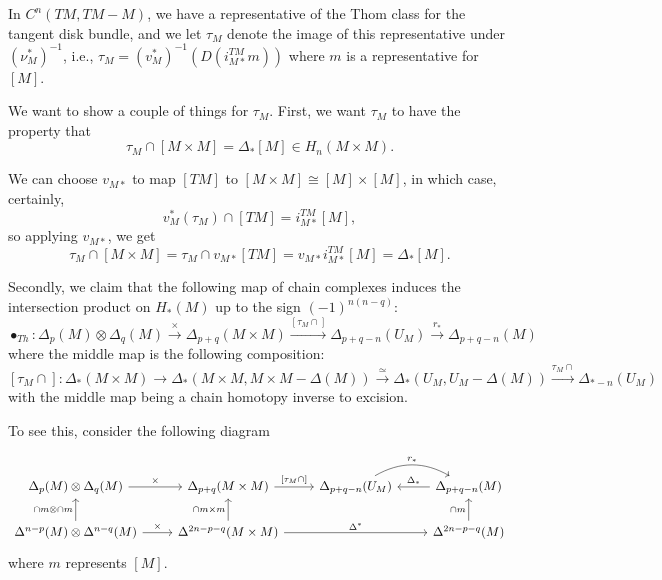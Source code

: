 \documentclass[reqno]{amsart}
\theoremstyle{definition}
\theoremstyle{remark}
\begin{document}
    In $C^{n}\left( TM, TM - M \right) $, we have
    a representative of the Thom class for
    the tangent disk bundle, and we let
    $\tau_M$ denote the image of this representative
    under $(\nu_M^{*})^{-1}$, i.e.,
    $\tau_M = (v_M^{*})^{-1} \left( D\left( i_{M*}^{TM} m
    \right)  \right) $
    where $m$ is a representative for
    $\left[ M \right] $.

    We want to show a couple of things for
    $\tau_M$. 
    First\todo{}, we want
    $\tau_M$ to have the property that
    \[
    \tau_M \cap \left[ M \times M \right] = 
    \Delta_* \left[ M \right]  \in H_n\left( M \times M \right) .
    \] 

    We can choose $v_{M*}$ to map
    $\left[ TM \right] $ to $\left[ M \times M \right] \cong
    \left[ M \right] \times \left[ M \right] $, in which case,
    certainly,
    \[
    v_M^{*}(\tau_M) \cap \left[ TM \right] =
    i_{M*}^{TM} \left[ M \right],
    \] 
    so applying $v_{M*}$, we get
    \[
    \tau_M \cap \left[ M \times M \right] =
    \tau_M \cap
    v_{M*} \left[ TM \right] = v_{M*} i_{M*}^{TM} \left[ M \right] 
    = \Delta_* \left[ M \right] .
    \] 
    


    Secondly, we claim that
    the following map of chain complexes induces the 
    intersection product on $H_* (M)$ up to the
    sign $(-1)^{n (n-q)}$:
    \[
    \bullet_{Th} \colon \Delta_p(M) \otimes
    \Delta_q(M) \stackrel{\times }{\to} \Delta_{p+q}(M \times M)
    \stackrel{\left[ \tau_M \cap \right] }{\to} 
    \Delta_{p+q-n}(U_M) \stackrel{r_*}{\to} \Delta_{p+q-n}(M)
    \] 
    where the middle map is the following composition:
    \[
    \left[ \tau_M \cap \right] \colon
    \Delta_* (M \times M) \to 
    \Delta_* \left( M \times M, M \times M - \Delta(M) \right) 
    \stackrel{\simeq}{\to} \Delta_* \left( U_M, U_M - \Delta(M) \right) 
    \stackrel{\tau_M \cap}{\to} \Delta_{*-n}(U_M)
    \] 
    with the middle map being a chain homotopy inverse to excision.\\
    \linebreak
    



    To see this, consider the following diagram

    \begin{equation*}
    \begin{tikzcd}
        \Delta_p (M) \otimes \Delta_q(M) \ar[r, "\times "] &
        \Delta_{p+q}(M \times M) \ar[r, "{[\tau_M \cap ]} "] &
        \Delta_{p+q-n} (U_M)
        \ar[r, bend left, "r_*"]& \Delta_{p+q-n}(M) \ar[l, "\Delta_*"'] \\
        \Delta^{n-p}(M) \otimes \Delta^{n-q}(M) 
        \ar[u, "{\cap m \otimes \cap m}"] \ar[r, "\times "] 
        & \Delta^{2n-p-q}(M \times M) 
        \ar[u, "{\cap m \times m}"] 
        \ar[rr, "\Delta^*"]&& \Delta^{2n-p-q}(M) \ar[u,"{\cap m}"]
    \end{tikzcd}
    \end{equation*}
    where $m$ represents $\left[ M \right] $.
\end{document}
